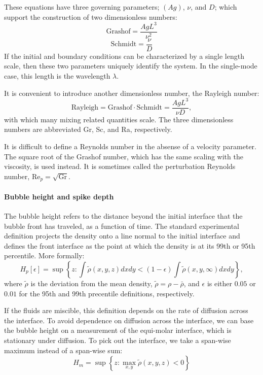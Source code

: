 These equations have three governing parameters; $(Ag)$, $\nu$, and $D$; which support the construction of two dimensionless numbers:
\begin{equation}
\text{Grashof} = \frac{Ag L^3}{\nu^2}
\end{equation}
\begin{equation}
\text{Schmidt} = \frac{\nu}{D}
\end{equation}
If the initial and boundary conditions can be characterized by a single length scale, then these two parameters uniquely identify the system.
In the single-mode case, this length is the wavelength $\lambda$.

It is convenient to introduce another dimensionless number, the Rayleigh number:
\begin{equation}
\text{Rayleigh} = \text{Grashof} \cdot \text{Schmidt} = \frac{A g L^3}{\nu D},
\end{equation}
with which many mixing related quantities scale.
The three dimensionless numbers are abbreviated Gr, Sc, and Ra, respectively.

It is difficult to define a Reynolds number in the absense of a velocity parameter.
The square root of the Grashof number, which has the same scaling with the viscosity, is used instead.
It is sometimes called the perturbation Reynolds number, $\text{Re}_p = \sqrt{\text{Gr}}$.

\paragraph{Bubble height and spike depth}

The bubble height refers to the distance beyond the initial interface that the bubble front has traveled, as a function of time.
The standard experimental definition projects the density onto a line normal to the initial interface and defines the front interface as the point at which the density is at its 99th or 95th percentile.
More formally:
\begin{equation}
H_p[\epsilon] = \sup \left\{z : \int \tilde\rho(x,y,z) dx dy < (1-\epsilon) \int \tilde\rho(x,y,\infty) dx dy \right\},
\end{equation}
where $\tilde\rho$ is the deviation from the mean density, $\tilde\rho = \rho - \bar\rho$, and $\epsilon$ is either $0.05$ or $0.01$ for the 95th and 99th precentile definitions, respectively.

If the fluids are miscible, this definition depends on the rate of diffusion across the interface.
To avoid dependence on diffusion across the interface, we can base the bubble height on a measurement of the equi-molar interface, which is stationary under diffusion.
To pick out the interface, we take a span-wise maximum instead of a span-wise sum:
\begin{equation}
H_m = \sup \left\{z : \max_{x,y} \tilde\rho(x,y,z) < 0 \right\}
\end{equation}

